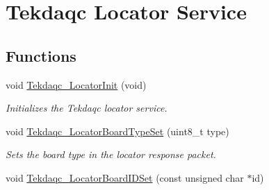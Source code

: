 \hypertarget{group__tekdaqc__locator}{\section{Tekdaqc Locator Service}
\label{group__tekdaqc__locator}
}
\subsection*{Functions}
\begin{DoxyCompactItemize}
\item 
void \hyperlink{group__tekdaqc__locator_ga99090049c7556abdcff2bad0dfdf78af}{Tekdaqc\-\_\-\-Locator\-Init} (void)
\begin{DoxyCompactList}\small\item\em Initializes the Tekdaqc locator service. \end{DoxyCompactList}\item 
void \hyperlink{group__tekdaqc__locator_ga668d2bf16094e0046055c231a3c2174c}{Tekdaqc\-\_\-\-Locator\-Board\-Type\-Set} (uint8\-\_\-t type)
\begin{DoxyCompactList}\small\item\em Sets the board type in the locator response packet. \end{DoxyCompactList}\item 
\hypertarget{group__tekdaqc__locator_ga87bf26021e9bb75cf09e9982a2ce657b}{void \hyperlink{group__tekdaqc__locator_ga87bf26021e9bb75cf09e9982a2ce657b}{Tekdaqc\-\_\-\-Locator\-Board\-I\-D\-Set} (const unsigned char $\ast$id)}\label{group__tekdaqc__locator_ga87bf26021e9bb75cf09e9982a2ce657b}


\end{DoxyCompactItemize}
